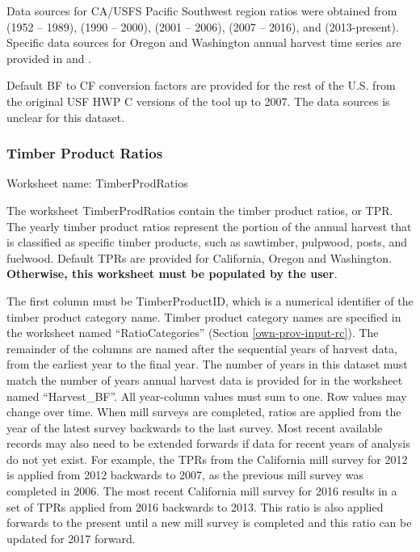 \documentclass[
  openany]{book}
\begin{document}
Data sources for CA/USFS Pacific Southwest region ratios were obtained from \textcite{keegan2010} (1952 -- 1989), \textcite{morgan2004} (1990 -- 2000), \textcite{morgan2012} (2001 -- 2006), \textcite{mciver2015} (2007 -- 2016), and \textcite{marcille2020} (2013-present). Specific data sources for Oregon and Washington annual harvest time series are provided in \textcite{morgan2021} and \textcite{nichols2020}.

Default BF to CF conversion factors are provided for the rest of the U.S. from the original USF HWP C versions of the tool up to 2007. The data sources is unclear for this dataset.

\hypertarget{own-prov-input-tpr}{%
\subsubsection{Timber Product Ratios}\label{own-prov-input-tpr}}

Worksheet name: TimberProdRatios

The worksheet TimberProdRatios contain the timber product ratios, or TPR. The yearly timber product ratios represent the portion of the annual harvest that is classified as specific timber products, such as sawtimber, pulpwood, posts, and fuelwood. Default TPRs are provided for California, Oregon and Washington. \textbf{Otherwise, this worksheet must be populated by the user}.

The first column must be TimberProductID, which is a numerical identifier of the timber product category name. Timber product category names are specified in the worksheet named ``RatioCategories'' (Section \ref{own-prov-input-rc}). The remainder of the columns are named after the sequential years of harvest data, from the earliest year to the final year. The number of years in this dataset must match the number of years annual harvest data is provided for in the worksheet named ``Harvest\_BF''. All year-column values must sum to one. Row values may change over time. When mill surveys are completed, ratios are applied from the year of the latest survey backwards to the last survey. Most recent available records may also need to be extended forwards if data for recent years of analysis do not yet exist. For example, the TPRs from the California mill survey for 2012 is applied from 2012 backwards to 2007, as the previous mill survey was completed in 2006. The most recent California mill survey for 2016 results in a set of TPRs applied from 2016 backwards to 2013. This ratio is also applied forwards to the present until a new mill survey is completed and this ratio can be updated for 2017 forward.
\end{document}
